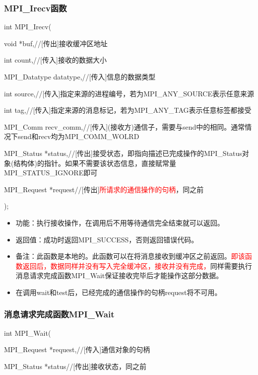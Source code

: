 \documentclass[UTF8]{article}%
\begin{document}
\subsubsection{MPI\_Irecv函数}

int MPI\_Irecv(

    \qquad void            *buf,//[传出]接收缓冲区地址

    \qquad int             count,//[传入]接收的数据大小

    \qquad MPI\_Datatype   datatype,//[传入]信息的数据类型

    \qquad int             source,//[传入]指定来源的进程编号，若为MPI\_ANY\_SOURCE表示任意来源

    \qquad int             tag,//[传入]指定来源的消息标记，若为MPI\_ANY\_TAG表示任意标签都接受

    \qquad MPI\_Comm       recv\_comm,//[传入](接收方)通信子，需要与send中的相同。通常情况下send和recv均为MPI\_COMM\_WOLRD

    \qquad MPI\_Status     *status,//[传出]接受状态，即指向描述已完成操作的MPI\_Status对象(结构体)的指针。如果不需要该状态信息，直接赋常量MPI\_STATUS\_IGNORE即可

    \qquad MPI\_Request    *request//[传出]\textcolor{red}{所请求的通信操作的句柄}，同之前

);

\begin{itemize}
    \item 功能：执行接收操作，在调用后不用等待通信完全结束就可以返回。
    \item 返回值：成功时返回MPI\_SUCCESS，否则返回错误代码。
    \item 备注：此函数是本地的。此函数可以在将消息接收到缓冲区之前返回。\textcolor{red}{即该函数返回后，数据同样并没有写入完全缓冲区，接收并没有完成，}同样需要执行消息请求完成函数MPI\_Wait保证接收完毕后才能操作这部分数据。
    \item 在调用wait和test后，已经完成的通信操作的句柄request将不可用。
\end{itemize}

\subsubsection{消息请求完成函数MPI\_Wait}

int MPI\_Wait(

    \qquad MPI\_Request *request,//[传入]通信对象的句柄

    \qquad MPI\_Status  *status//[传出]接收状态，同之前
\end{document}
